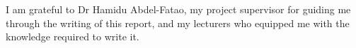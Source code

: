 

\begin{acknowledgements}      %
I am grateful to Dr Hamidu Abdel-Fatao, my project supervisor for guiding me through the writing of this report, and my lecturers who equipped me with the knowledge required to write it.
\end{acknowledgements}



